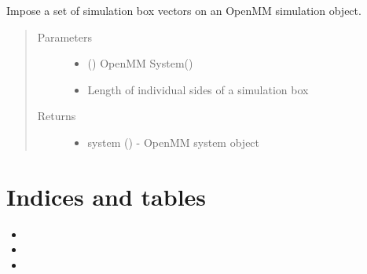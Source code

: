 \documentclass[letterpaper,12pt,english,openany,oneside]{sphinxmanual}
\begin{document}
\begin{fulllineitems}
\label{\detokenize{utilities:utilities.util.set_box_vectors}}
Impose a set of simulation box vectors on an OpenMM simulation object.
\begin{quote}\begin{description}
\item[{Parameters}] \leavevmode\begin{itemize}
\item {} 
 () \textendash{} OpenMM System()

\item {} 
 \textendash{} Length of individual sides of a simulation box

\end{itemize}

\item[{Returns}] \leavevmode
\begin{itemize}
\item {} 
system () - OpenMM system object

\end{itemize}


\end{description}\end{quote}

\end{fulllineitems}



\chapter{Indices and tables}
\label{\detokenize{index:indices-and-tables}}\begin{itemize}
\item {} 

\item {} 

\item {} 

\end{itemize}
\end{document}

